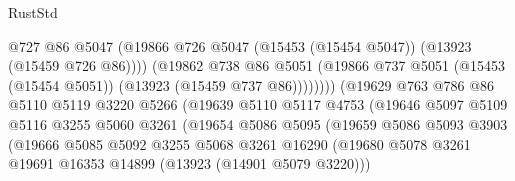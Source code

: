 \begin{lexlean}{RustStd}
\begin{coremodule}
                                        @727
                                        @86
                                        @5047
                                        (@19866
                                          @726
                                          @5047
                                          (@15453 (@15454 @5047))
                                          (@13923 (@15459 @726 @86))))
                                      (@19862
                                        @738
                                        @86
                                        @5051
                                        (@19866
                                          @737
                                          @5051
                                          (@15453 (@15454 @5051))
                                          (@13923 (@15459 @737 @86))))))))
                              (@19629
                                @763
                                @786
                                @86
                                @5110
                                @5119
                                @3220
                                @5266
                                (@19639
                                  @5110
                                  @5117
                                  @4753
                                  (@19646
                                    @5097
                                    @5109
                                    @5116
                                    @3255
                                    @5060
                                    @3261
                                    (@19654
                                      @5086
                                      @5095
                                      (@19659
                                        @5086
                                        @5093
                                        @3903
                                        (@19666
                                          @5085
                                          @5092
                                          @3255
                                          @5068
                                          @3261
                                          @16290
                                          (@19680
                                            @5078
                                            @3261
                                            @19691
                                            @16353
                                            @14899
                                            (@13923 (@14901 @5079 @3220)))

\end{coremodule}
\end{lexlean}
